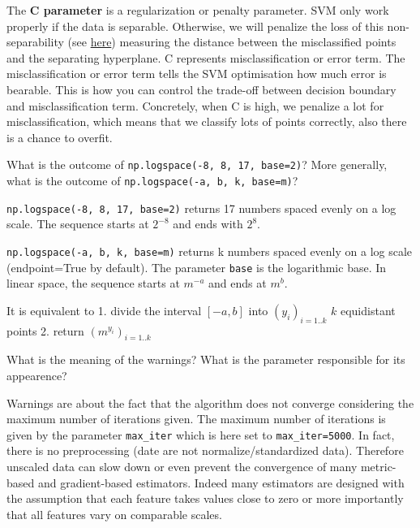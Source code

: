 \documentclass[10pt,a4paper]{article}
\theoremstyle{break}
\begin{document}
The \textbf{C parameter} is a regularization or penalty parameter. SVM only work properly if the data is separable. Otherwise, we will penalize the loss of this non-separability (see \href{https://scikit-learn.org/stable/modules/svm.html\#svc}{here}) measuring the distance between the misclassified points and the separating hyperplane. C represents misclassification or error term. The misclassification or error term tells the SVM optimisation how much error is bearable. This is how you can control the trade-off between decision boundary and misclassification term. Concretely, when C is high, we penalize a lot for misclassification, which means that we classify lots of points correctly, also there is a chance to overfit.

\begin{tcolorbox}

What is the outcome of \texttt{np.logspace(-8,\ 8,\ 17,\ base=2)}? More generally, what is the outcome of \texttt{np.logspace(-a,\ b,\ k,\ base=m)}?

\end{tcolorbox}

\texttt{np.logspace(-8,\ 8,\ 17,\ base=2)} returns 17 numbers spaced evenly on a log scale. The sequence starts at \(2^{-8}\) and ends with \(2^{8}\).

\texttt{np.logspace(-a,\ b,\ k,\ base=m)} returns k numbers spaced evenly on a log scale (endpoint=True by default). The parameter \texttt{base} is the logarithmic base. In linear space, the sequence starts at \(m^{-a}\) and ends at \(m^b\).

It is equivalent to
1. divide the interval \([-a,b]\) into \((y_i)_{i=1..k}\) \(k\) equidistant points
2. return \(\left(m^{y_i}\right)_{i=1..k}\)

\begin{tcolorbox}

What is the meaning of the warnings? What is the parameter responsible for its appearence?

\end{tcolorbox}

Warnings are about the fact that the algorithm does not converge considering the maximum number of iterations given. The maximum number of iterations is given by the parameter \texttt{max\_iter} which is here set to \texttt{max\_iter=5000}.
In fact, there is no preprocessing (date are not normalize/standardized data). Therefore unscaled data can slow down or even prevent the convergence of many metric-based and gradient-based estimators. Indeed many estimators are designed with the assumption that each feature takes values close to zero or more importantly that all features vary on comparable scales.
\end{document}
